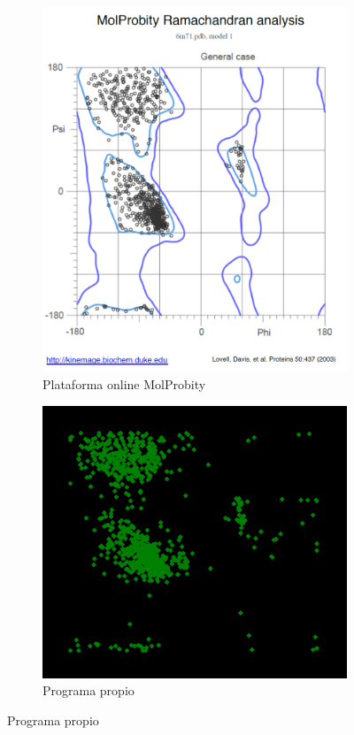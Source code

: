 \documentclass[a4paper,11pt]{report}
\begin{document}
 \begin{figure}[h!]
	\centering
	\begin{subfigure}{0.45\textwidth}
		\includegraphics[width=\linewidth]{Figuras/Figura15}
		\caption{Plataforma online MolProbity }
	\end{subfigure}   
	\begin{subfigure}{0.5\textwidth}
		\includegraphics[width=\linewidth]{Figuras/Figura16}
		\caption{Programa propio}
	\end{subfigure}


\end{figure}
\end{document}
